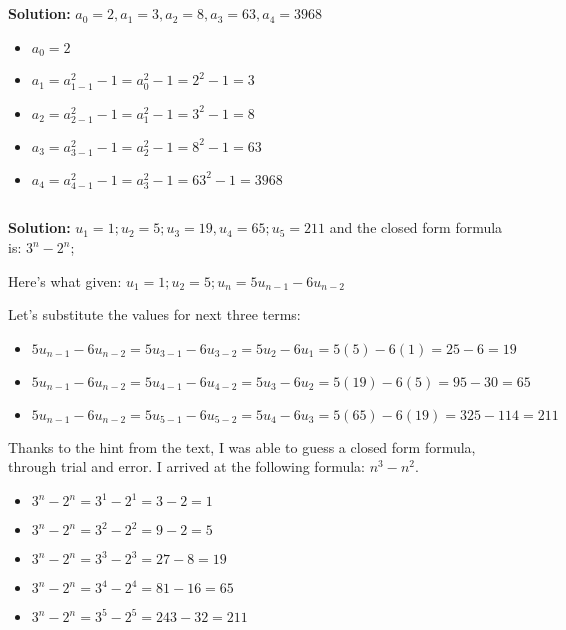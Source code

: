 \documentclass{article}
\begin{document}
\subsection{}

\textbf{Solution:} $a_0 = 2, a_1 = 3, a_2 = 8, a_3 = 63, a_4 = 3968$

\begin{itemize}
    \item $a_0 = 2$
    \item $a_1 = a^2_{1-1} - 1 = a^2_{0} - 1 = 2^2 - 1 = 3$
    \item $a_2 = a^2_{2-1} - 1 = a^2_{1} - 1 = 3^2 - 1 = 8$
    \item $a_3 = a^2_{3-1} - 1 = a^2_{2} - 1 = 8^2 - 1 = 63$
    \item $a_4 = a^2_{4-1} - 1 = a^2_{3} - 1 = 63^2 - 1 = 3968$
\end{itemize}

\subsection{}

\textbf{Solution: } $u_1 = 1; u_2 = 5; u_3 = 19, u_4 = 65; u_5 = 211$ and the closed form formula is: $3^n - 2^n$;

Here's what given: $u_1 = 1; u_2 = 5; u_n = 5u_{n-1} - 6u_{n-2}$

Let's substitute the values for next three terms:

\begin{itemize}
    \item $5u_{n-1} - 6u_{n-2} = 5u_{3-1} - 6u_{3-2} = 5u_{2} - 6u_{1} = 5(5) - 6(1) = 25 - 6 = 19$
    \item $5u_{n-1} - 6u_{n-2} = 5u_{4-1} - 6u_{4-2} = 5u_{3} - 6u_{2} = 5(19) - 6(5) = 95 - 30 = 65$
    \item $5u_{n-1} - 6u_{n-2} = 5u_{5-1} - 6u_{5-2} = 5u_{4} - 6u_{3} = 5(65) - 6(19) = 325 - 114 = 211$
\end{itemize}

Thanks to the hint from the text, I was able to guess a closed form formula, through trial and error. I arrived at the following formula: $n^3 - n^2$.

\begin{itemize}
    \item $3^n - 2^n = 3^1 - 2^1 = 3 - 2 = 1$
    \item $3^n - 2^n = 3^2 - 2^2 = 9 - 2 = 5$
    \item $3^n - 2^n = 3^3 - 2^3 = 27 - 8 = 19$
    \item $3^n - 2^n = 3^4 - 2^4 = 81 - 16 = 65$
    \item $3^n - 2^n = 3^5 - 2^5 = 243 - 32 = 211$
\end{itemize}
\end{document}
